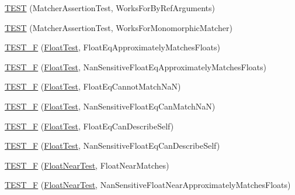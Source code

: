 \begin{DoxyCompactItemize}
\hyperlink{namespacetesting_1_1gmock__matchers__test_afcf1287c7fd759157367026613ddd727}{T\+E\+ST} (Matcher\+Assertion\+Test, Works\+For\+By\+Ref\+Arguments)
\item 
\hyperlink{namespacetesting_1_1gmock__matchers__test_a0fe4bde05f667c4877e3b4a4a7bde002}{T\+E\+ST} (Matcher\+Assertion\+Test, Works\+For\+Monomorphic\+Matcher)
\item 
\hyperlink{namespacetesting_1_1gmock__matchers__test_a69257e935b4334c835b3ad26acea9104}{T\+E\+S\+T\+\_\+F} (\hyperlink{namespacetesting_1_1gmock__matchers__test_a145329e433869625f9f0e98a0cdfd7b4}{Float\+Test}, Float\+Eq\+Approximately\+Matches\+Floats)
\item 
\hyperlink{namespacetesting_1_1gmock__matchers__test_abb691880cd22f6f444c978547b13f792}{T\+E\+S\+T\+\_\+F} (\hyperlink{namespacetesting_1_1gmock__matchers__test_a145329e433869625f9f0e98a0cdfd7b4}{Float\+Test}, Nan\+Sensitive\+Float\+Eq\+Approximately\+Matches\+Floats)
\item 
\hyperlink{namespacetesting_1_1gmock__matchers__test_a111f0c8a5ec17b47e8eb6226e1c2cb58}{T\+E\+S\+T\+\_\+F} (\hyperlink{namespacetesting_1_1gmock__matchers__test_a145329e433869625f9f0e98a0cdfd7b4}{Float\+Test}, Float\+Eq\+Cannot\+Match\+NaN)
\item 
\hyperlink{namespacetesting_1_1gmock__matchers__test_a4e9d89902e088a10915b4f9463ac0f09}{T\+E\+S\+T\+\_\+F} (\hyperlink{namespacetesting_1_1gmock__matchers__test_a145329e433869625f9f0e98a0cdfd7b4}{Float\+Test}, Nan\+Sensitive\+Float\+Eq\+Can\+Match\+NaN)
\item 
\hyperlink{namespacetesting_1_1gmock__matchers__test_a264de01a5019e5c358116845bf5edd14}{T\+E\+S\+T\+\_\+F} (\hyperlink{namespacetesting_1_1gmock__matchers__test_a145329e433869625f9f0e98a0cdfd7b4}{Float\+Test}, Float\+Eq\+Can\+Describe\+Self)
\item 
\hyperlink{namespacetesting_1_1gmock__matchers__test_a95a2bbc273ff70fc364c5c9c4697834c}{T\+E\+S\+T\+\_\+F} (\hyperlink{namespacetesting_1_1gmock__matchers__test_a145329e433869625f9f0e98a0cdfd7b4}{Float\+Test}, Nan\+Sensitive\+Float\+Eq\+Can\+Describe\+Self)
\item 
\hyperlink{namespacetesting_1_1gmock__matchers__test_a6897409da5003f20f891d8a5ecabdc99}{T\+E\+S\+T\+\_\+F} (\hyperlink{namespacetesting_1_1gmock__matchers__test_a426b51f464dcb48033946e1bf3cc8795}{Float\+Near\+Test}, Float\+Near\+Matches)
\item 
\hyperlink{namespacetesting_1_1gmock__matchers__test_ad396e996ed685fd80cbd78740b8d01a8}{T\+E\+S\+T\+\_\+F} (\hyperlink{namespacetesting_1_1gmock__matchers__test_a426b51f464dcb48033946e1bf3cc8795}{Float\+Near\+Test}, Nan\+Sensitive\+Float\+Near\+Approximately\+Matches\+Floats)

\end{DoxyCompactItemize}
